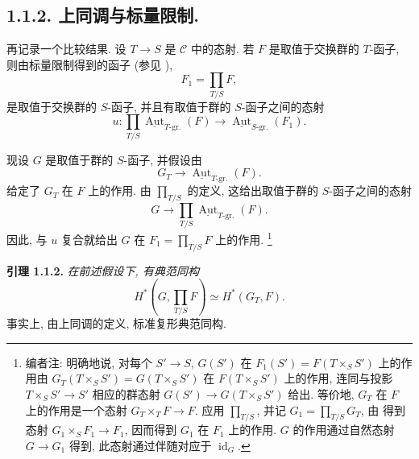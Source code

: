 \subsection*{1.1.2. 上同调与标量限制.\protect\footnotemark}
再记录一个比较结果. 设 \(T\to S\) 是 \(\mathscr C\) 中的态射.
若 \(F\) 是取值于交换群的 \(T\)-函子,
则由标量限制得到的函子 (参见 ),
\[
 F_1=\prod_{T/S}F,
\]
是取值于交换群的 \(S\)-函子, 并且有取值于群的
\(S\)-函子之间的态射\footnotemark
\[
 u:\prod_{T/S}
 \underline{\operatorname{Aut}}_{T\text{-gr.}}(F)
 \longrightarrow
 \underline{\operatorname{Aut}}_{S\text{-gr.}}(F_1).
\]

现设 \(G\) 是取值于群的 \(S\)-函子, 并假设由
\[
 G_T\longrightarrow
 \underline{\operatorname{Aut}}_{T\text{-gr.}}(F).
\]
给定了 \(G_T\) 在 \(F\) 上的作用.
由 \(\prod_{T/S}\) 的定义, 这给出取值于群的 \(S\)-函子之间的态射
\[
 G\longrightarrow
 \prod_{T/S}\underline{\operatorname{Aut}}_{T\text{-gr.}}(F).
\]
因此, 与 \(u\) 复合就给出 \(G\) 在
\(F_1=\prod_{T/S}F\) 上的作用.
\footnote{编者注: 明确地说, 对每个 \(S'\to S\),
\(G(S')\) 在 \(F_1(S')=F(T\times_S S')\) 上的作用由
\(G_T(T\times_S S')=G(T\times_S S')\) 在 \(F(T\times_S S')\)
上的作用, 连同与投影 \(T\times_S S'\to S'\)
相应的群态射 \(G(S')\to G(T\times_S S')\) 给出.
等价地, \(G_T\) 在 \(F\) 上的作用是一个态射
\(G_T\times_T F\to F\). 应用 \(\prod_{T/S}\), 并记
\(G_1=\prod_{T/S}G_T\), 由 
得到态射 \(G_1\times_S F_1\to F_1\), 因而得到
\(G_1\) 在 \(F_1\) 上的作用. \(G\) 的作用通过自然态射
\(G\to G_1\) 得到, 此态射通过伴随对应于
\(\operatorname{id}_G\).}

\medskip
\noindent{}\textbf{引理 1.1.2.}
\textit{在前述假设下, 有典范同构}
\[
 H^\ast\!\left(G,\prod_{T/S}F\right)
 \simeq H^\ast(G_T,F).
\]
事实上, 由上同调的定义, 标准复形典范同构.

